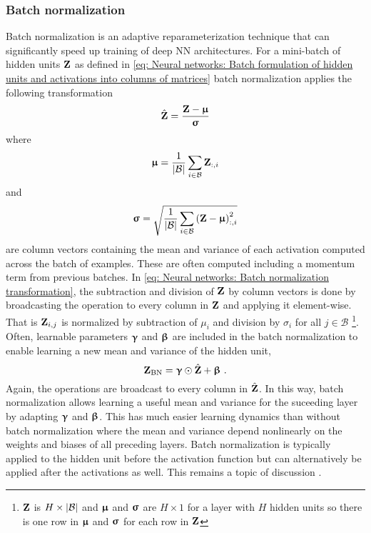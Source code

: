 \subsubsection{Batch normalization}
Batch normalization \cite{Ioffe2015a} is an adaptive reparameterization technique that can significantly speed up training of deep \gls{NN} architectures. For a mini-batch of hidden units ${\mathbf{Z}}$ as defined in \eqref{eq: Neural networks: Batch formulation of hidden units and activations into columns of matrices} batch normalization applies the following transformation
\begin{equation}\label{eq: Neural networks: Batch normalization transformation}
    \hat{{\mathbf{Z}}}= \frac{{\mathbf{Z}}-{\boldsymbol{\upmu}}}{{\boldsymbol{\upsigma}}}
\end{equation}
where
\begin{align}\label{eq: Neural networks: Batch normalization: Mean}
    {\boldsymbol{\upmu}} = \frac{1}{{\left\lvert\mathcal{B}\right\rvert}}\sum_{i\in\mathcal{B}} {\mathbf{Z}}_{:,i}
\end{align}
and
\begin{equation}\label{eq: Neural networks: Batch normalization: Variance}
    {\boldsymbol{\upsigma}} = \sqrt{\frac{1}{{\left\lvert\mathcal{B}\right\rvert}}\sum_{i\in\mathcal{B}} {\left({\mathbf{Z}}-{\boldsymbol{\upmu}}\right)}^2_{:,i}}
\end{equation}
are column vectors containing the mean and variance of each activation computed across the batch of examples. These are often computed including a momentum term from previous batches. In \eqref{eq: Neural networks: Batch normalization transformation}, the subtraction and division of ${\mathbf{Z}}$ by column vectors is done by broadcasting the operation to every column in ${\mathbf{Z}}$ and applying it element-wise. That is ${\mathbf{Z}}_{i,j}$ is normalized by subtraction of $\mu_i$ and division by $\sigma_i$ for all $j\in\mathcal{B}$ \footnote{${\mathbf{Z}}$ is $H\times{\left\lvert\mathcal{B}\right\rvert}$ and ${\boldsymbol{\upmu}}$ and ${\boldsymbol{\upsigma}}$ are $H\times1$ for a layer with $H$ hidden units so there is one row in ${\boldsymbol{\upmu}}$ and ${\boldsymbol{\upsigma}}$ for each row in ${\mathbf{Z}}$}. Often, learnable parameters ${\boldsymbol{\upgamma}}$ and ${\boldsymbol{\upbeta}}$ are included in the batch normalization to enable learning a new mean and variance of the hidden unit,
\begin{equation}
    {\mathbf{Z}}_\text{BN} = {\boldsymbol{\upgamma}}\odot\hat{{\mathbf{Z}}} + {\boldsymbol{\upbeta}} \ .
\end{equation}
Again, the operations are broadcast to every column in $\hat{{\mathbf{Z}}}$. In this way, batch normalization allows learning a useful mean and variance for the suceeding layer by adapting ${\boldsymbol{\upgamma}}$ and ${\boldsymbol{\upbeta}}$. This has much easier learning dynamics than without batch normalization where the mean and variance depend nonlinearly on the weights and biases of all preceding layers.
Batch normalization is typically applied to the hidden unit before the activation function but can alternatively be applied after the activations as well. This remains a topic of discussion \cite{Goodfellow2016}.

